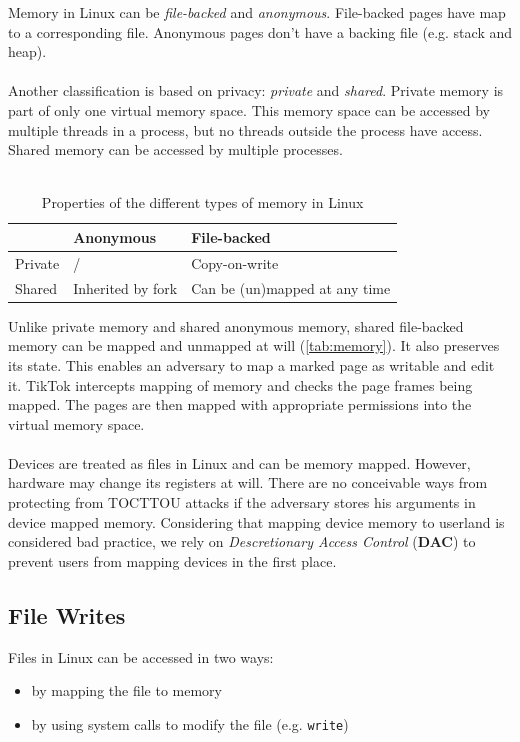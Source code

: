 Memory in Linux can be \emph{file-backed} and \emph{anonymous}. File-backed pages have map to a corresponding file. 
Anonymous pages don't have a backing file (e.g. stack and heap).
\\
\\
Another classification is based on privacy: \emph{private} and \emph{shared}. Private memory is part of only one virtual memory space.
This memory space can be accessed by multiple threads in a process, but no threads outside the process have access.
Shared memory can be accessed by multiple processes.
\\
\\
\begin{table}[]
  \begin{tabular}{|l|l|l|}
  \hline
          & Anonymous                            & File-backed                           \\ \hline
  Private & /                                    & Copy-on-write                         \\ \hline
  Shared  & Inherited by fork                    & Can be (un)mapped at any time         \\ \hline
  \end{tabular}
  \caption{Properties of the different types of memory in Linux}
  \label{tab:memory}
\end{table}
Unlike private memory and shared anonymous memory, shared file-backed memory can be mapped and unmapped at will (\autoref{tab:memory}). It 
also preserves its state. This enables an adversary to map a marked page as writable and edit it. 
TikTok intercepts mapping of memory and checks the page frames being mapped. The pages are then mapped
with appropriate permissions into the virtual memory space.
\\
\\
Devices are treated as files in Linux and can be memory mapped. However, hardware may change its registers at will.
There are no conceivable ways from protecting from TOCTTOU attacks if the adversary stores his arguments in device
mapped memory. Considering that mapping device memory to userland is considered bad practice, we rely on \emph{Descretionary
Access Control} (\textbf{DAC}) to prevent users from mapping devices in the first place.

\subsection{File Writes}
\label{subsec:filewrites}
Files in Linux can be accessed in two ways:
\begin{itemize}
    \item by mapping the file to memory
    \item by using system calls to modify the file (e.g. \texttt{write})
\end{itemize}

